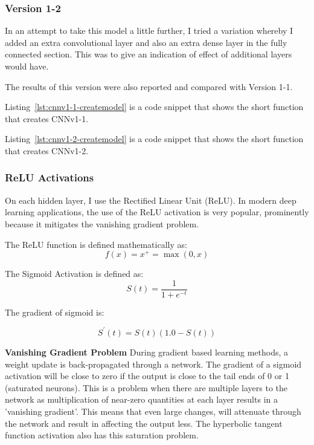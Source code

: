 \documentclass[12pt,a4paper,twoside]{report}
\begin{document}
\subsubsection{Version 1-2}
In an attempt to take this model a little further, I tried a variation whereby I added an extra convolutional layer and also an extra dense layer in the fully connected section. This was to give an indication of effect of additional layers would have.

The results of this version were also reported and compared with Version 1-1. 

Listing~\ref{lst:cnnv1-1-createmodel} is a code snippet that shows the short function that creates CNNv1-1. 



Listing~\ref{lst:cnnv1-2-createmodel} is a code snippet that shows the short function that creates CNNv1-2. 





\subsubsection{ReLU Activations}

On each hidden layer, I use the Rectified Linear Unit (ReLU). In modern deep learning applications, the use of the ReLU activation is very popular, prominently because it mitigates the vanishing gradient problem. 

The ReLU function is defined mathematically as:
$$f ( x ) = x ^ { + } = \max ( 0,x )$$

The Sigmoid Activation is defined as:
$$S ( t ) = \frac { 1} { 1+ e ^ { - t } }$$

The gradient of sigmoid is:

$$S ^ { \prime } ( t ) = S ( t ) ( 1.0- S ( t ) )$$

\textbf{Vanishing Gradient Problem}
During gradient based learning methods, a weight update is back-propagated through a network. The gradient of a sigmoid activation will be close to zero if the output is close to the tail ends of 0 or 1 (saturated neurons). This is a problem when there are multiple layers to the network as multiplication of near-zero quantities at each layer results in a 'vanishing gradient'. This means that even large changes, will attenuate through the network and result in affecting the output less. The hyperbolic tangent function activation also has this saturation problem. 
\end{document}
